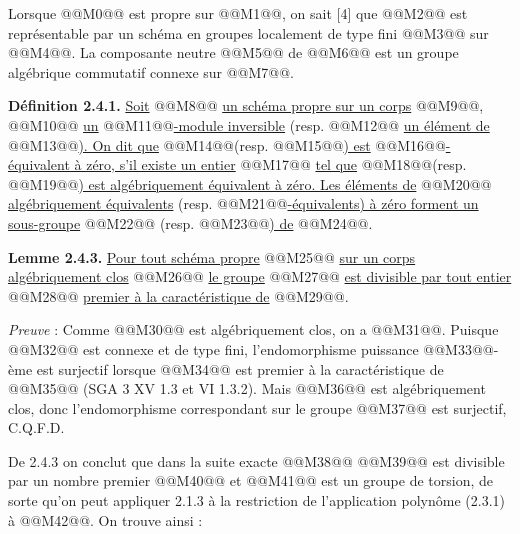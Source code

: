 


Lorsque @@M0@@ est propre sur @@M1@@, on sait [4] que @@M2@@ est représentable par un schéma en groupes localement de type fini @@M3@@ sur @@M4@@. La composante neutre @@M5@@ de @@M6@@ est un groupe algébrique commutatif connexe sur @@M7@@.

\textbf{Définition 2.4.1.} \uline{Soit} @@M8@@ \uline{un schéma propre sur un corps} @@M9@@, @@M10@@ \uline{un} @@M11@@\uline{-module inversible} (resp. @@M12@@ \uline{un élément de} @@M13@@\uline{). On dit que} @@M14@@(resp. @@M15@@\uline{) est} @@M16@@\uline{-équivalent à zéro, s'il existe un entier} @@M17@@ \uline{tel que} @@M18@@(resp. @@M19@@\uline{) est algébriquement équivalent à zéro. Les éléments de} @@M20@@ \uline{algébriquement équivalents} (resp. @@M21@@\uline{-équivalents) à zéro forment un sous-groupe} @@M22@@ (resp. @@M23@@\uline{) de} @@M24@@.

\textbf{Lemme 2.4.3.} \uline{Pour tout schéma propre} @@M25@@ \uline{sur un corps algébriquement clos} @@M26@@ \uline{le groupe} @@M27@@ \uline{est divisible par tout entier} @@M28@@ \uline{premier à la caractéristique de} @@M29@@.

\emph{Preuve} : Comme @@M30@@ est algébriquement clos, on a @@M31@@. Puisque @@M32@@ est connexe et de type fini, l'endomorphisme puissance @@M33@@-ème est surjectif lorsque @@M34@@ est premier à la caractéristique de @@M35@@ (SGA 3 XV 1.3 et VI 1.3.2). Mais @@M36@@ est algébriquement clos, donc l'endomorphisme correspondant sur le groupe @@M37@@ est surjectif, C.Q.F.D.

De 2.4.3 on conclut que dans la suite exacte
@@M38@@
@@M39@@ est divisible par un nombre premier @@M40@@ et @@M41@@ est un groupe de torsion, de sorte qu'on peut appliquer 2.1.3 à la restriction de l'application polynôme (2.3.1) à @@M42@@. On trouve ainsi :

